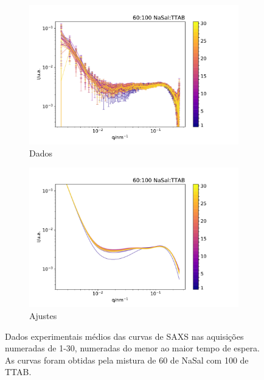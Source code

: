	\begin{figure}[h]
		\begin{subfigure}[t]{0.5\textwidth}
			\centering
			\includegraphics[width=\textwidth]{imagens/saxs/TR_saxs_60_100_3_dados.pdf}
			\caption{Dados}
			\label{fig:saxs_tr_60_3_d}
		\end{subfigure}%
		\begin{subfigure}[t]{0.5\textwidth}
			\centering
			\includegraphics[width=\textwidth]{imagens/saxs/TR_saxs_60_100_3_ajustes.pdf}
			\caption{Ajustes}
			\label{fig:saxs_tr_60_3_a}
		\end{subfigure}
		\caption{Dados experimentais médios das curvas de SAXS nas aquisições numeradas de 1-30, numeradas do menor ao maior tempo de espera. As curvas foram obtidas pela mistura de 60 \mM{} de NaSal com 100 \mM{} de TTAB.}
		\label{fig:saxs_tr_60_3}
	\end{figure} 

